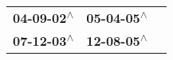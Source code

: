 \begin{supertabular}{lll}
 \textbf{04-09-02\textsuperscript{$\wedge$}} &  \textbf{05-04-05\textsuperscript{$\wedge$}} \\
 \textbf{07-12-03\textsuperscript{$\wedge$}} &  \textbf{12-08-05\textsuperscript{$\wedge$}} \\
\end{supertabular}
